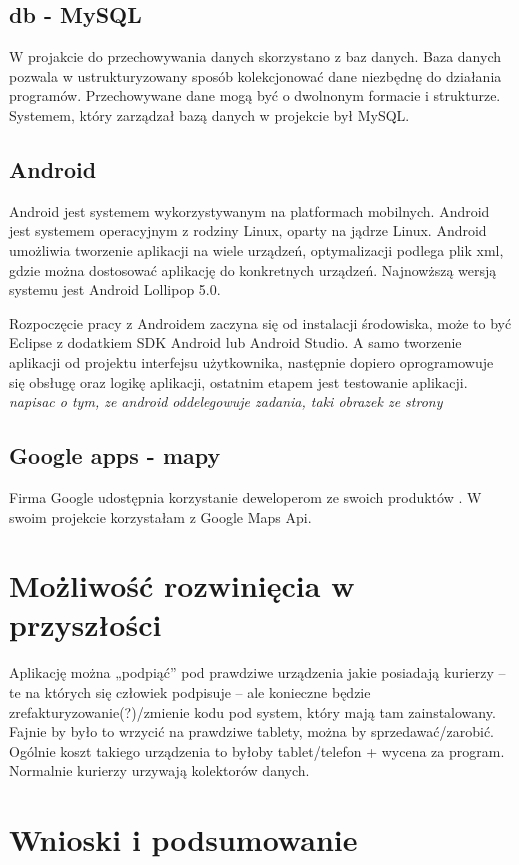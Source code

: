 \documentclass[eng,printmode,oneside]{mgr}
\begin{document}
\section{db - MySQL}

W projakcie do przechowywania danych skorzystano z baz danych. Baza danych
pozwala w ustrukturyzowany sposób kolekcjonować dane niezbędnę do działania
programów. Przechowywane dane mogą być o dwolnonym formacie i strukturze.
Systemem, który zarządzał bazą danych w projekcie był MySQL.

\section{Android}

Android jest systemem wykorzystywanym na platformach mobilnych. Android
jest systemem operacyjnym z rodziny Linux, oparty na jądrze Linux. Android
umożliwia tworzenie aplikacji na wiele urządzeń, optymalizacji podlega plik xml,
gdzie można dostosować aplikację do konkretnych urządzeń. Najnowższą wersją
systemu jest Android Lollipop 5.0. 

Rozpoczęcie pracy z Androidem zaczyna się od instalacji środowiska, może to być
Eclipse z dodatkiem SDK Android lub Android Studio. A samo tworzenie aplikacji
od projektu interfejsu użytkownika, następnie dopiero oprogramowuje się obsługę
oraz logikę aplikacji, ostatnim etapem jest testowanie aplikacji.
\cite{developer.android}
\emph{\color{komentarz}napisac o tym, ze android oddelegowuje zadania, taki
obrazek ze strony}

\section{Google apps - mapy}

Firma Google udostępnia korzystanie deweloperom ze swoich produktów
\cite{developer.google}. W swoim projekcie korzystałam z Google Maps Api. 

\chapter{Możliwość rozwinięcia w przyszłości}
Aplikację można „podpiąć” pod prawdziwe urządzenia jakie posiadają kurierzy – te na których się człowiek podpisuje – ale konieczne będzie 
zrefakturyzowanie(?)/zmienie kodu pod system, który mają tam zainstalowany.
	Fajnie by było to wrzycić na prawdziwe tablety, można by sprzedawać/zarobić. Ogólnie koszt takiego urządzenia to byłoby tablet/telefon 
	+ wycena za program.
	Normalnie kurierzy urzywają kolektorów danych.

\chapter{Wnioski i podsumowanie}

\listoffigures
\listoftables
\lstlistoflistings
\end{document}
